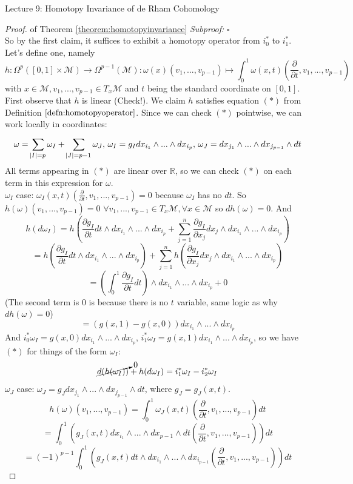 \documentclass[10pt]{article}
\theoremstyle{plain}
\theoremstyle{definition}
\newenvironment{subproof}{\textit{Subproof:}}{\hfill$\square$}
\newcommand{\Real}{\mathbb{R}}
\newcommand{\man}{\mathcal{M}}
\newcommand{\xman}{x\in\man}
\newcommand{\allthevs}[2]{v_{#1},...,v_{#2}}
\newcommand{\allthewedge}[3]{{#1}_{#2}\wedge...\wedge{#1}_{#3}}
\newcommand{\tang}{T_x\man}
\newcommand{\pformman}[1]{\Omega^{#1}(\man)}
\newcommand{\dx}{dx}
\newcommand{\deriv}{d}
\newcommand{\dw}{d\omega}
\newcommand{\dt}{\deriv t}
\newcommand{\sumfromto}[2]{\sum\limits_{#1}^{#2}}
\newcommand{\inter}{\left[0,1\right]}
\newcommand{\parderiv}[1]{\frac{\partial}{\partial {#1}}}
\begin{document}
\begin{section}{Lecture 9: Homotopy Invariance of de Rham Cohomology}
\begin{proof}{of Theorem \ref{theorem:homotopyinvariance}}
\begin{subproof}
\end{subproof}\\
So by the first claim, it suffices to exhibit a homotopy operator from $i^*_0$ to $i_1^*$. Let's define one, namely $$h:\Omega^p(\inter\times\man) \to \pformman{p-1}: \omega(x)(v_1,...,v_{p-1}) \mapsto \int_0^1 \omega(x,t) \left(\frac{\partial}{\partial t}, v_1,...,v_{p-1}\right)$$ with $x\in \man, \allthevs{1}{p-1}\in T_x \man$ and $t$ being the standard coordinate on $\inter$. First observe that $h$ is linear (Check!). We claim $h$ satisfies equation $(*)$ from Definition $\ref{defn:homotopyoperator}$. Since we can check $(*)$ pointwise, we can work locally in coordinates: $$\omega = \sumfromto{\abs{I} = p}{} \omega _I + \sumfromto{\abs{J} = p-1}{} \omega _J,\, \omega_I = g_I \allthewedge{\dx}{i_1}{i_p}, \, \omega_J = \allthewedge{\dx}{j_1}{j_{p-1}}\wedge \dt$$
All terms appearing in $(*)$ are linear over $\Real$, so we can check $(*)$ on each term in this expression for $\omega$.\\
$\omega _I$ case: $\omega_I(x,t)\left(\parderiv{t} , v_1,...,v_{p-1}\right) = 0$ because $\omega_I$ has no $\dt$. So $h(\omega)(\allthevs{1}{p-1})=0\,\,\forall \allthevs{1}{p-1}\in \tang, \forall \xman$ so $\deriv h(\omega) = 0$. And $$h(\dw_I) = h\left(\frac{\partial g_I}{\partial t} \dt \wedge \allthewedge{\dx}{i_1}{i_p} + \sumfromto{j=1}{n}\frac{\partial g_I}{\partial x_j}\dx_j \wedge \allthewedge{\dx}{i_1}{i_p}\right)$$
$$= h\left(\frac{\partial g_I}{\partial t} \dt \wedge \allthewedge{\dx}{i_1}{i_p}\right) + \sumfromto{j=1}{n} h\left( \frac{\partial g_I}{\partial x_j}\dx_j \wedge \allthewedge{\dx}{i_1}{i_p}\right)$$
$$ = \left(\int_0^1\frac{\partial g_I}{\partial t}\dt \right)\wedge \allthewedge{\dx}{i_1}{i_p} + 0$$
(The second term is 0 is because there is no $t$ variable, same logic as why $\deriv h(\omega) = 0$)
$$= \left(g(x,1)-g(x,0)\right)\allthewedge{\dx}{i_1}{i_p}$$
And $i_0^*\omega_I = g(x,0)\allthewedge{\dx}{i_1}{i_p},\, i_1^*\omega_I = g(x,1)\allthewedge{\dx}{i_1}{i_p}$, so we have $(*)$ for things of the form $\omega_I$:
$$\cancelto{0}{\deriv(h(\omega_I))} + h(\dw_I) = i_1^* \omega_I - i_2^*\omega_I$$
$\omega_J$ case: $\omega _J = g_J \allthewedge{\dx}{j_1}{j_{p-1}} \wedge \dt$, where $g_J = g_J(x,t)$.
$$h(\omega) (\allthevs{1}{p-1}) = \int_0^1 \omega_J(x,t) \left(\parderiv{t},\allthevs{1}{p-1}\right) \dt$$
$$ = \int_0^1 \left(g_J(x,t) \allthewedge{\dx}{i_1}{p-1}\wedge \dt \left(\parderiv{t} , \allthevs{1}{p-1}\right)\right)\dt$$
$$= (-1)^{p-1}\int_0^1 \left(g_J(x,t) \dt \wedge \allthewedge{\dx}{i_1}{i_{p-1}}\left(\parderiv{t},\allthevs{1}{p-1}\right)\right)\dt$$

\end{proof}
\end{section}
\end{document}
